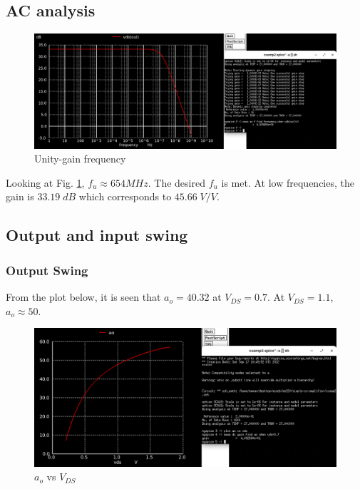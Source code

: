 \documentclass[conference]{IEEEtran}
\begin{document}
\subsection{AC analysis}
\begin{figure}[H]
	\centering 
	\includegraphics[width=\columnwidth]{fumax.png}
	\caption{Unity-gain frequency}
	\label{fu-vstar}	
\end{figure}
Looking at Fig. \ref{fu-vstar}, $f_u \approx 654MHz$. The desired $f_u$ is met. At low frequencies, the gain is $33.19\; dB$ which corresponds to $45.66\; V/V$.
\subsection{Output and input swing}
\subsubsection{Output Swing}
From the plot below, it is seen that $a_o=40.32$ at $V_{DS}=0.7$. At $V_{DS}=1.1$, $a_o\approx 50$.
\begin{figure}[H]
	\centering 
	\includegraphics[width=\columnwidth]{gain-fumax-vds.png}
	\caption{$a_o$ vs $V_{DS}$}
	\label{ao-fumax-vds}	
\end{figure}
\end{document}
